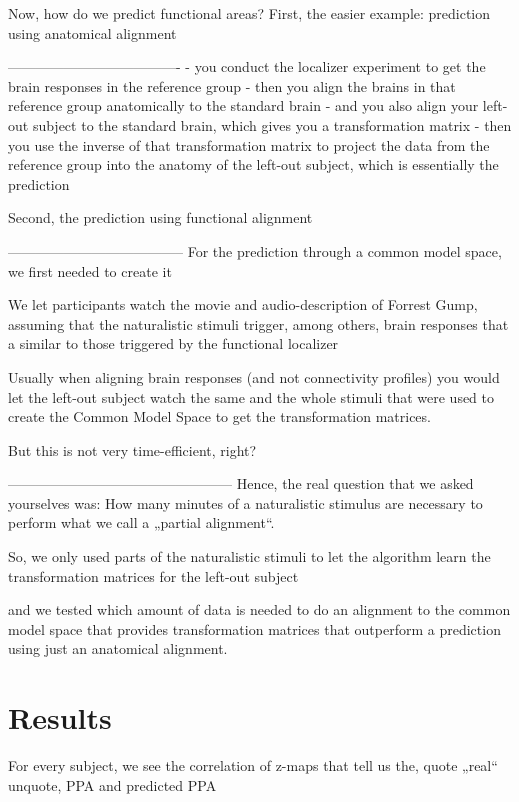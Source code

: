 Now, how do we predict functional areas?
First, the easier example: prediction using anatomical alignment

-------------------------------------
- you conduct the localizer experiment to get the brain responses in the reference group
- then you align the brains in that reference group anatomically
  to the standard brain
- and you also align your left-out subject to the standard brain,
  which gives you a transformation matrix
- then you use the inverse of that transformation matrix to project the data
  from the reference group into the anatomy of the left-out subject,
  which is essentially the prediction

Second, the prediction using functional alignment

--------------------------------------
For the prediction through a common model space,
we first needed to create it

We let participants watch the movie and audio-description of Forrest Gump,
assuming that the naturalistic stimuli trigger, among others,
brain responses that a similar to those triggered by the functional localizer

Usually when aligning brain responses (and not connectivity profiles) you would let the left-out subject watch the same and the whole stimuli
that were used to create the Common Model Space to get the transformation matrices.

But this is not very time-efficient, right?

------------------------------------------------
Hence, the real question that we asked yourselves was:
How many minutes of a naturalistic stimulus are necessary to perform what we call a „partial alignment“.

So, we only used parts of the naturalistic stimuli to let the algorithm learn the transformation matrices for the left-out subject

and we tested
which amount of data is needed to do an alignment to the common model space
that provides transformation matrices that outperform a prediction using just an anatomical alignment.



\section{Results}


For every subject, we see the correlation of z-maps that tell us the, quote „real“ unquote, PPA and predicted PPA


